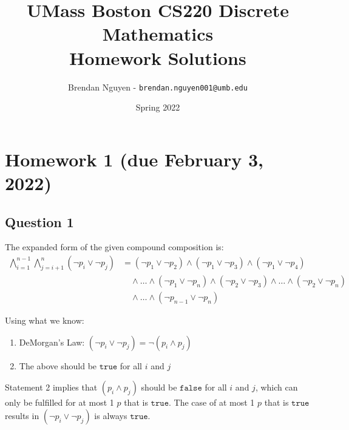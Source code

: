 \documentclass[letterpaper, 12pt]{article}
\title{UMass Boston CS220 Discrete Mathematics\\Homework Solutions}
\author{Brendan Nguyen - \texttt{brendan.nguyen001@umb.edu}}
\date{Spring 2022}
\begin{document}
\maketitle
\tableofcontents
\newpage

\section*{Homework 1 (due February 3, 2022)}

\subsection*{Question 1}
The expanded form of the given compound composition is:
\[
    \begin{split}
        \bigwedge_{i=1}^{n-1} \bigwedge_{j=i+1}^n (\neg p_i \lor \neg p_j) &= (\neg p_1 \lor \neg p_2) \land (\neg p_1 \lor \neg p_3) \land (\neg p_1 \lor \neg p_4)\\
        &\quad\land \ldots \land (\neg p_1 \lor \neg p_n) \land (\neg p_2 \lor \neg p_3) \land \ldots \land (\neg p_2 \lor \neg p_n)\\
        &\quad\land \ldots \land (\neg p_{n-1} \lor \neg p_n)
    \end{split}
\]
	
Using what we know:

\begin{enumerate}[label=\arabic*.]
  \item DeMorgan's Law: $(\neg p_i \lor \neg p_j) = \neg (p_i \land p_j)$
  \item The above should be $\texttt{true}$ for all $i$ and $j$
\end{enumerate}

Statement 2 implies that $(p_i \land p_j)$ should be $\texttt{false}$ for all $i$ and $j$, which can only be fulfilled for at most 1 $p$ that is $\texttt{true}$. The case of at most 1 $p$ that is $\texttt{true}$ results in $(\neg p_i \lor \neg p_j)$ is always $\texttt{true}$.
\end{document}
